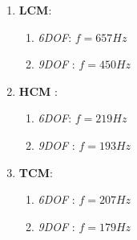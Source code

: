\begin{enumerate}
	\item \textbf{LCM}:
	\begin{enumerate}
		\item \textit{6DOF}: $f = 657 Hz $
		\item \textit{9DOF} : $f = 450 Hz $
	\end{enumerate}
	\item \textbf{HCM} :
	\begin{enumerate}
		\item \textit{6DOF}: $f = 219 Hz $
		\item \textit{9DOF} : $f = 193 Hz $
	\end{enumerate}
	\item \textbf{TCM}:
	\begin{enumerate}
		\item \textit{6DOF} : $f = 207 Hz $
		\item \textit{9DOF} : $f = 179 Hz $
	\end{enumerate}
\end{enumerate}



